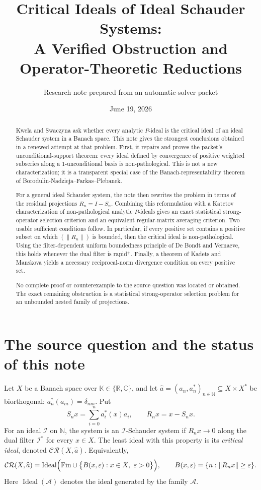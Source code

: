 \documentclass[11pt]{article}
\title{Critical Ideals of Ideal Schauder Systems:\\
A Verified Obstruction and Operator-Theoretic Reductions}
\author{Research note prepared from an automatic-solver packet}
\date{June 19, 2026}
\theoremstyle{definition}
\theoremstyle{remark}
\newcommand{\N}{\mathbb N}
\newcommand{\K}{\mathbb K}
\newcommand{\I}{\mathcal I}
\newcommand{\CR}{\mathcal{CR}}
\newcommand{\Fin}{\mathrm{Fin}}
\newcommand{\Ideal}{\operatorname{Ideal}}
\newcommand{\eps}{\varepsilon}
\begin{document}
\maketitle

\begin{abstract}
Kwela and Swaczyna ask whether every analytic $P$-ideal is the critical ideal
of an ideal Schauder system in a Banach space.  This note gives the strongest
conclusions obtained in a renewed attempt at that problem.  First, it repairs
and proves the packet's unconditional-support theorem: every ideal defined by
convergence of positive weighted subseries along a $1$-unconditional basis is
non-pathological.  This is not a new characterization; it is a transparent
special case of the Banach-representability theorem of
Borodulin-Nadzieja--Farkas--Plebanek.

For a general ideal Schauder system, the note then rewrites the problem in
terms of the residual projections $R_n=I-S_n$.  Combining this reformulation
with a Katetov characterization of non-pathological analytic $P$-ideals gives
an exact statistical strong-operator selection criterion and an equivalent
regular-matrix averaging criterion.  Two usable sufficient conditions follow.
In particular, if every positive set contains a positive subset on which
$(\|R_n\|)$ is bounded, then the critical ideal is non-pathological.  Using the
filter-dependent uniform boundedness principle of De Bondt and Vernaeve, this
holds whenever the dual filter is rapid$^+$.  Finally, a theorem of Kadets and
Manskova yields a necessary reciprocal-norm divergence condition on every
positive set.

No complete proof or counterexample to the source question was located or
obtained.  The exact remaining obstruction is a statistical strong-operator
selection problem for an unbounded nested family of projections.
\end{abstract}

\section{The source question and the status of this note}

Let $X$ be a Banach space over $\K\in\{\mathbb R,\mathbb C\}$, and let
$\widehat a=(a_n,a_n^*)_{n\in\N}\subseteq X\times X^*$ be biorthogonal:
$a_n^*(a_m)=\delta_{nm}$.  Put
\[
 S_nx=\sum_{i=0}^n a_i^*(x)a_i,
 \qquad
 R_nx=x-S_nx.
\]
For an ideal $\I$ on $\N$, the system is an $\I$-Schauder system if
$R_nx\to0$ along the dual filter $\I^*$ for every $x\in X$.  The least ideal
with this property is its \emph{critical ideal}, denoted $\CR(X,\widehat a)$.
Equivalently,
\begin{equation}\label{eq:critical-definition}
 \CR(X,\widehat a)
 =\Ideal\Bigl(\Fin\cup
   \bigl\{B(x,\eps):x\in X,\ \eps>0\bigr\}\Bigr),
 \qquad
 B(x,\eps)=\{n:\|R_nx\|\geq\eps\}.
\end{equation}
Here $\Ideal(\mathcal A)$ denotes the ideal generated by the family
$\mathcal A$.
\end{document}
